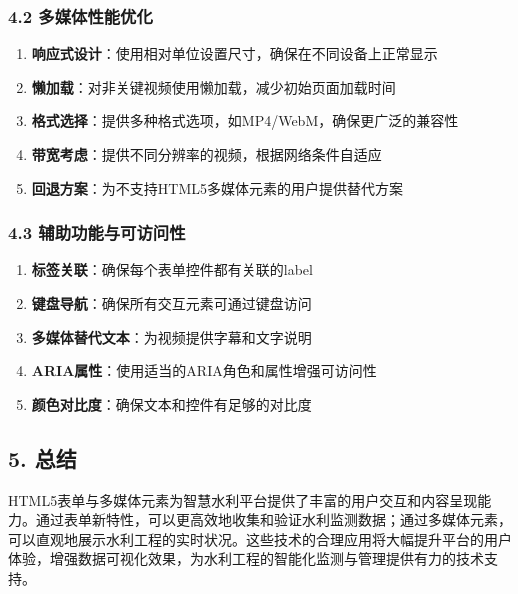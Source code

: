 \subsubsection{4.2
多媒体性能优化}\label{ux591aux5a92ux4f53ux6027ux80fdux4f18ux5316}

\begin{enumerate}
\def\labelenumi{\arabic{enumi}.}
\tightlist
\item
  \textbf{响应式设计}：使用相对单位设置尺寸，确保在不同设备上正常显示
\item
  \textbf{懒加载}：对非关键视频使用懒加载，减少初始页面加载时间
\item
  \textbf{格式选择}：提供多种格式选项，如MP4/WebM，确保更广泛的兼容性
\item
  \textbf{带宽考虑}：提供不同分辨率的视频，根据网络条件自适应
\item
  \textbf{回退方案}：为不支持HTML5多媒体元素的用户提供替代方案
\end{enumerate}

\subsubsection{4.3
辅助功能与可访问性}\label{ux8f85ux52a9ux529fux80fdux4e0eux53efux8bbfux95eeux6027}

\begin{enumerate}
\def\labelenumi{\arabic{enumi}.}
\tightlist
\item
  \textbf{标签关联}：确保每个表单控件都有关联的label
\item
  \textbf{键盘导航}：确保所有交互元素可通过键盘访问
\item
  \textbf{多媒体替代文本}：为视频提供字幕和文字说明
\item
  \textbf{ARIA属性}：使用适当的ARIA角色和属性增强可访问性
\item
  \textbf{颜色对比度}：确保文本和控件有足够的对比度
\end{enumerate}

\subsection{5. 总结}\label{ux603bux7ed3}

HTML5表单与多媒体元素为智慧水利平台提供了丰富的用户交互和内容呈现能力。通过表单新特性，可以更高效地收集和验证水利监测数据；通过多媒体元素，可以直观地展示水利工程的实时状况。这些技术的合理应用将大幅提升平台的用户体验，增强数据可视化效果，为水利工程的智能化监测与管理提供有力的技术支持。
